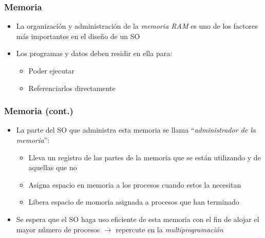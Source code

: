 \begin{frame}
  \frametitle{Memoria}
  \begin{itemize}
	  \item La organización y administración de la \textit{memoria RAM} es uno de los factores más importantes en el diseño de un SO
	  \item Los programas y datos deben residir en ella para:
	  \begin{itemize}
	  	\item Poder ejecutar
	  	\item Referenciarlos directamente
	  \end{itemize}
  \end{itemize}
\end{frame}

\begin{frame}
  \frametitle{Memoria (cont.)}
  \begin{itemize}
	  \item La parte del SO que administra esta memoria se llama ``\textit{administrador de la memoria}'':
	  \begin{itemize}
	  	\item Lleva un registro de las partes de la memoria que se están utilizando y de aquellas que no
	  	\item Asigna espacio en memoria a los procesos cuando estos la necesitan
	  	\item Libera espacio de momoria asignada a procesos que han terminado
	  \end{itemize}
	  \item Se espera que el SO haga uso eficiente de esta memoria con el fin de alojar el mayor número de procesos $\rightarrow$ repercute en la \emph{multiprogramación}
  \end{itemize}
\end{frame}

